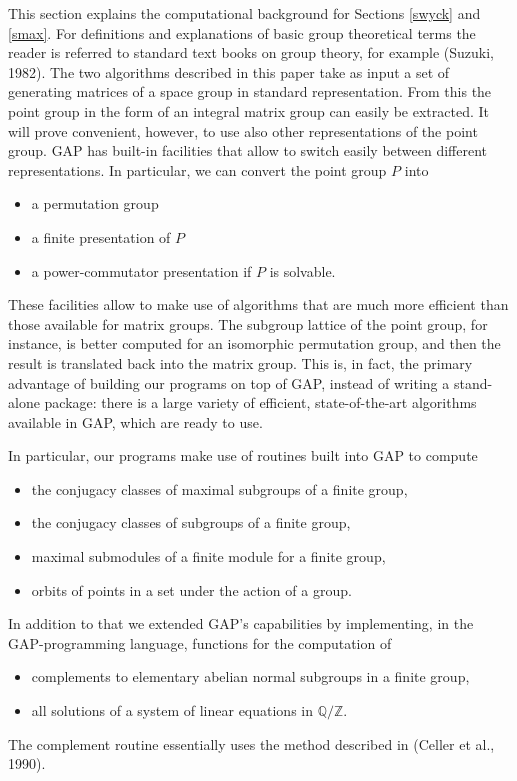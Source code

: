 \documentclass[12pt]{amsart}
\newcommand{\Q}{{\mathbb Q}}
\newcommand{\Z}{{\mathbb Z}}
\newcommand{\GAP}{{\sf GAP}}
\begin{document}
This section explains the computational background for Sections
\ref{swyck} and \ref{smax}.  For definitions and explanations of basic
group theoretical terms the reader is referred to standard text books
on group theory, for example (Suzuki, 1982).
The two algorithms described in this paper take as input a set of 
generating matrices of a space group in standard representation. 
 From this the point group in the form of an integral matrix group 
can easily be extracted. It will prove convenient, however, 
to use also other representations of the point group. 
{\GAP} has built-in facilities that allow to switch easily
between different representations. In particular, we can convert the
point group $P$ into
\begin{itemize}
\item a permutation group
\item a finite presentation of $P$ 
\item a power-commutator presentation if $P$ is solvable.
\end{itemize}
These facilities allow to make use of algorithms that are much
more efficient than those available for matrix groups. The subgroup
lattice of the point group, for instance, is better computed for an 
isomorphic permutation group,
and then the result is translated back into the matrix group.
This is, in fact, the primary advantage of building our programs
on top of GAP, instead of writing a stand-alone package: there is a 
large variety of efficient, state-of-the-art algorithms available in 
\GAP, which are ready to use.  

In particular, our programs make use of routines built into {\GAP} to
compute
\begin{itemize}
\item the conjugacy classes of maximal subgroups of a finite group,
\item the conjugacy classes of subgroups of a finite group,
\item maximal submodules of a finite module for a finite group,
\item orbits of points in a set under the action of a group.
\end{itemize}

In addition to that we extended {\GAP}'s capabilities by implementing,
in the {\GAP}-programming language, functions for the computation of
\begin{itemize}
\item complements to elementary abelian normal subgroups in a finite 
group,
\item all solutions of a system of linear equations in $\Q/\Z.$
\end{itemize}
The complement routine essentially uses the method described in 
(Celler et al., 1990).
\end{document}
